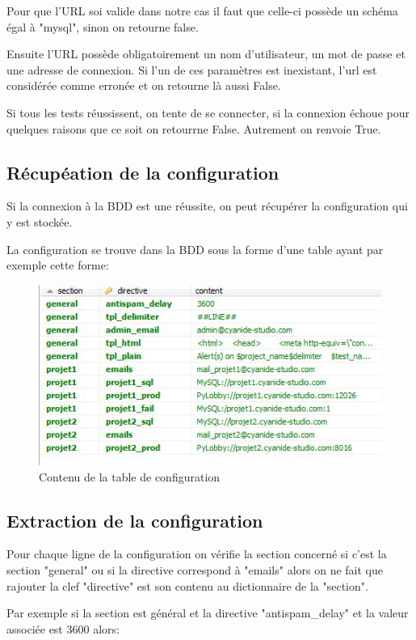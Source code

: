 Pour que l'URL soi valide dans notre cas il faut que celle-ci possède un schéma égal à "mysql", sinon on retourne false.

Ensuite l'URL possède obligatoirement un nom d'utilisateur, un mot de passe et une adresse de connexion. Si l'un de ces paramètres est inexistant,  l'url est considérée comme erronée et on retourne là aussi False.

Si tous les tests réussissent, on tente de se connecter, si la connexion échoue pour quelques raisons que ce soit on retourrne False. Autrement on renvoie True.


\subsection*{Récupéation de la configuration}
Si la connexion à la BDD est une réussite, on peut récupérer la configuration qui y est stockée.

La configuration se trouve dans la BDD sous la forme d'une table ayant par exemple cette forme:

\begin{figure}[h!]
	\centering
	\includegraphics[scale=0.6]{images/cyavision_config_db.jpg}
	\caption{Contenu de la table de configuration}
\end{figure}

\newpage

\subsection*{Extraction de la configuration}

Pour chaque ligne de la configuration on vérifie la section concerné si c'est la section "general" ou si la directive correspond à "emails" alors on ne fait que rajouter la clef "directive" est son contenu au dictionnaire de la "section". 

Par exemple si la section est général et la directive "antispam\_delay" et la valeur associée est 3600 alors:

